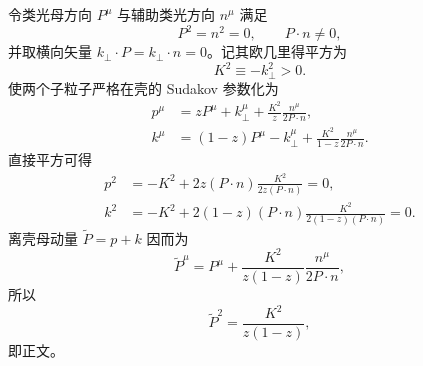 \begin{derivation}
令类光母方向 $P^\mu$ 与辅助类光方向 $n^\mu$ 满足
\begin{equation*}
 P^2=n^2=0,
 \qquad P\cdot n\neq0,
\end{equation*}
并取横向矢量 $k_\perp\cdot P=k_\perp\cdot n=0$。记其欧几里得平方为
\begin{equation*}
 K^2\equiv-k_\perp^2>0.
\end{equation*}
使两个子粒子严格在壳的 Sudakov 参数化为
\begin{align*}
 p^\mu
 &=zP^\mu+k_\perp^\mu
 +\frac{K^2}{z}\frac{n^\mu}{2P\cdot n},\\
 k^\mu
 &=(1-z)P^\mu-k_\perp^\mu
 +\frac{K^2}{1-z}\frac{n^\mu}{2P\cdot n}.
\end{align*}
直接平方可得
\begin{align*}
 p^2
 &=-K^2+2z(P\cdot n)\frac{K^2}{2z(P\cdot n)}=0,\\
 k^2
 &=-K^2+2(1-z)(P\cdot n)
 \frac{K^2}{2(1-z)(P\cdot n)}=0.
\end{align*}
离壳母动量 $\widetilde P=p+k$ 因而为
\begin{equation*}
 \widetilde P^\mu
 =P^\mu+\frac{K^2}{z(1-z)}\frac{n^\mu}{2P\cdot n},
\end{equation*}
所以
\begin{equation*}
 \widetilde P^2=\frac{K^2}{z(1-z)},
\end{equation*}
即正文。


\end{derivation}
